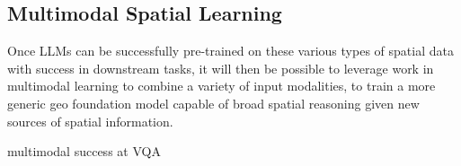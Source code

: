 \subsection{Multimodal Spatial Learning}
Once LLMs can be successfully pre-trained on these various types of spatial data with success in downstream tasks, it will then be possible to leverage work in multimodal learning to combine a variety of input modalities, to train a more generic geo foundation model capable of broad spatial reasoning given new sources of spatial information.


\cite{Fei2022} multimodal success at VQA

